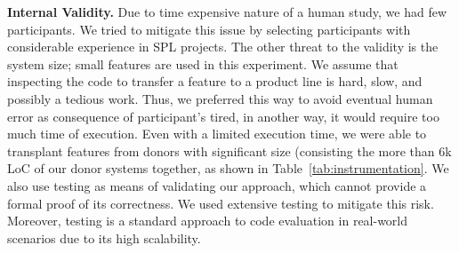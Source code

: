 \textbf{Internal Validity.} Due to time expensive nature of a human study, we had few participants. We tried to mitigate this issue by selecting participants with considerable experience in SPL projects. The other threat to the validity is the system size; small features are used in this experiment. We assume that inspecting the code to transfer a feature to a product line is hard, slow, and possibly a tedious work.  Thus, we preferred this way to avoid eventual human error as consequence of participant's tired, in another way, it would require too much time of execution. Even with a limited execution time, we were able to transplant features from donors with significant size (consisting the more than 6k LoC of our donor systems together, as shown in Table~\ref{tab:instrumentation}. We also use testing as means of validating our approach, which cannot provide a formal proof of its correctness.  We used extensive testing to mitigate this risk. Moreover, testing is a standard approach to code evaluation in real-world scenarios due to its high scalability.